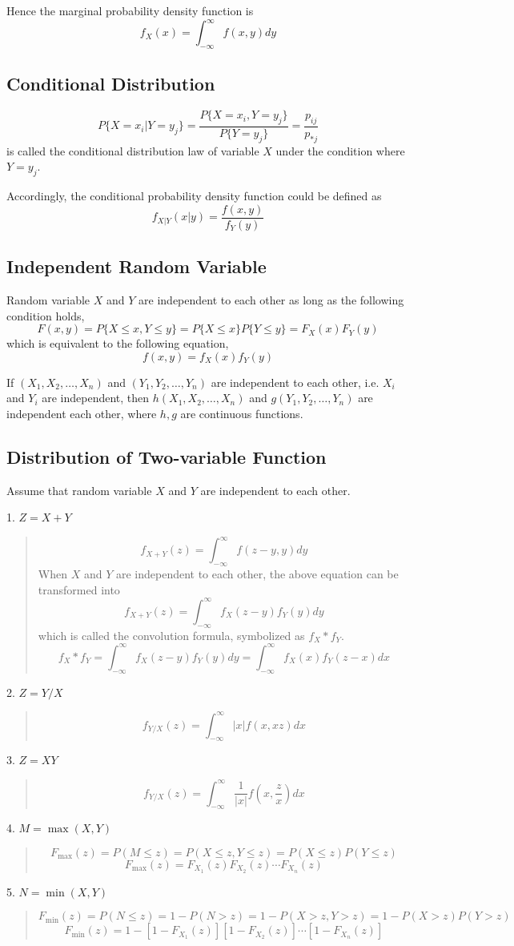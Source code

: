 Hence the marginal probability density function is
$$ f_X(x) = \int_{-\infty}^\infty f(x,y) dy $$

\subsection{Conditional Distribution}

$$ P\{X=x_i|Y=y_j\} = \frac{P\{X=x_i,Y=y_j\}}{P\{Y=y_j\}} = \frac{p_{ij}}{p_{*j}}$$
is called the conditional distribution law of variable $X$ under the condition
where $Y=y_j$.

Accordingly, the conditional probability density function could be defined as
$$f_{X|Y}(x|y) = \frac{f(x,y)}{f_Y(y)}$$

\subsection{Independent Random Variable}

Random variable $X$ and $Y$ are independent to each other as long as the
following condition holds,
$$ F(x,y) = P\{X\leq x, Y\leq y\} = P\{X\leq x\}P\{Y\leq y\} = F_X(x)F_Y(y)$$
which is equivalent to the following equation,
$$ f(x,y) = f_X(x) f_Y(y) $$

If $(X_1,X_2,\ldots,X_n)$ and $(Y_1,Y_2,\ldots,Y_n)$ are independent to each
other, i.e. $X_i$ and $Y_i$ are independent, then $h(X_1,X_2,\ldots,X_n)$ and
$g(Y_1,Y_2,\ldots,Y_n)$ are independent each other, where $h,g$ are continuous
functions.

\subsection{Distribution of Two-variable Function}

Assume that random variable $X$ and $Y$ are independent to each other.

1. $Z=X+Y$
\begin{quote}
	$$ f_{X+Y}(z) = \int_{-\infty}^\infty f(z-y, y)dy $$
	When $X$ and $Y$ are independent to each other, the above equation
	can be transformed into
	$$ f_{X+Y}(z) = \int_{-\infty}^\infty f_X(z-y)f_Y(y)dy$$
	which is called the convolution formula, symbolized as $f_X*f_Y$.
	$$ f_X*f_Y = \int_{-\infty}^\infty f_X(z-y)f_Y(y)dy
	           = \int_{-\infty}^\infty f_X(x)f_Y(z-x)dx$$
\end{quote}
2. $Z=Y/X$
\begin{quote}
	$$ f_{Y/X}(z) = \int_{-\infty}^\infty |x|f(x,xz)dx $$
\end{quote}
3. $Z=XY$
\begin{quote}
	$$ f_{Y/X}(z) = \int_{-\infty}^\infty \frac{1}{|x|}f(x,\frac{z}{x})dx $$
\end{quote}
4. $M=\max(X,Y)$
\begin{quote}
	$$ F_{\max}(z) = P(M\leq z) = P(X\leq z, Y\leq z) = P(X\leq z)P(Y\leq z)$$
	$$ F_{\max}(z) = F_{X_1}(z)F_{X_2}(z)\cdots F_{X_n}(z) $$
\end{quote}
5. $N=\min(X,Y)$
\begin{quote}
	$$ F_{\min}(z) = P(N\leq z) = 1-P(N>z) = 1-P(X>z,Y>z) = 1-P(X>z)P(Y>z)$$
	$$ F_{\min}(z) = 1-[1-F_{X_1}(z)][1-F_{X_2}(z)]\cdots [1-F_{X_n}(z)] $$
\end{quote}

